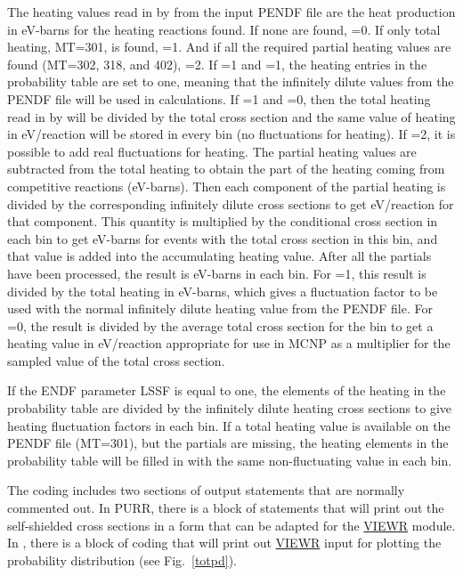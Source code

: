 The heating values read in by  from the input PENDF file
are the heat production in eV-barns for the heating reactions found.
If none are found, =0.  If only total heating, MT=301,
is found, =1.  And if all the required partial heating
values are found (MT=302, 318, and 402), =2.  If
=1 and =1, the heating entries in the
probability table are set to one, meaning that the infinitely
dilute values from the PENDF file will be used in calculations.  If
=1 and =0, then the total heating read in
by  will be divided by the total cross section and
the same value of heating in eV/reaction will be stored in every
bin (no fluctuations for heating).  If =2, it is possible
to add real fluctuations for heating.  The partial heating values
are subtracted from the total heating to obtain the part of the
heating coming from competitive reactions (eV-barns).  Then each
component of the partial heating is divided by the corresponding
infinitely dilute cross sections to get eV/reaction for that
component.  This quantity is multiplied by the conditional cross
section in each bin to get eV-barns for events with the total cross
section in this bin, and that value is added into the accumulating
heating value.  After all the partials have been processed, the
result is eV-barns in each bin.  For =1, this result
is divided by the total heating in eV-barns, which gives a fluctuation
factor to be used with the normal infinitely dilute heating value from
the PENDF file.  For =0, the result is divided by the
average total cross section for the bin to get a heating value in
eV/reaction appropriate for use in MCNP as a multiplier for the
sampled value of the total cross section.

If the ENDF parameter LSSF is equal to one, the elements of the
heating in the probability table are divided by the infinitely dilute
heating cross sections to give heating fluctuation factors in each bin.
If a total heating value is available on the PENDF file (MT=301), but
the partials are missing, the heating elements in the probability
table will be filled in with the same non-fluctuating value in each bin.

The coding includes two sections of output statements that are
normally commented out.  In PURR, there is a block of
statements that will print out the self-shielded cross sections
in a form that can be adapted for the
\hyperlink{sVIEWRhy}{VIEWR} module.  In ,
there is a block of coding that will print out
\hyperlink{sVIEWRhy}{VIEWR} input
for plotting the probability distribution (see Fig.~\ref{totpd}).


